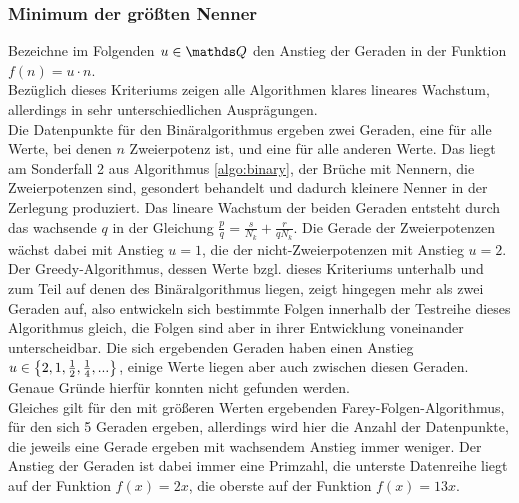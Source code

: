 \subsubsection{Minimum der größten Nenner}
Bezeichne im Folgenden $u \in \Q$ den Anstieg der Geraden in der Funktion $f(n)=u \cdot n$.\\
Bezüglich dieses Kriteriums zeigen alle Algorithmen klares lineares Wachstum, allerdings in sehr unterschiedlichen Ausprägungen.\\ 
Die Datenpunkte für den Binäralgorithmus ergeben zwei Geraden, eine für alle Werte, bei denen $n$ Zweierpotenz ist, und eine für alle anderen Werte. Das liegt am Sonderfall 2 aus Algorithmus \ref{algo:binary}, der Brüche mit Nennern, die Zweierpotenzen sind, gesondert behandelt und dadurch kleinere Nenner in der Zerlegung produziert. Das lineare Wachstum der beiden Geraden entsteht durch das wachsende $q$ in der Gleichung $\frac{p}{q} = \frac{s}{N_k} + \frac{r}{qN_k}$. Die Gerade der Zweierpotenzen wächst dabei mit Anstieg $u = 1$, die der nicht-Zweierpotenzen mit Anstieg $u=2$.\\
Der Greedy-Algorithmus, dessen Werte bzgl. dieses Kriteriums unterhalb und zum Teil auf denen des Binäralgorithmus liegen, zeigt hingegen mehr als zwei Geraden auf, also entwickeln sich bestimmte Folgen innerhalb der Testreihe dieses Algorithmus gleich, die Folgen sind aber in ihrer Entwicklung voneinander unterscheidbar. Die sich ergebenden Geraden haben einen Anstieg $u \in \left\{ 2, 1, \frac{1}{2}, \frac{1}{4}, ... \right\}$, einige Werte liegen aber auch zwischen diesen Geraden. Genaue Gründe hierfür konnten nicht gefunden werden.\\
Gleiches gilt für den mit größeren Werten ergebenden Farey-Folgen-Algorithmus, für den sich 5 Geraden ergeben, allerdings wird hier die Anzahl der Datenpunkte, die jeweils eine Gerade ergeben mit wachsendem Anstieg immer weniger. Der Anstieg der Geraden ist dabei immer eine Primzahl, die unterste Datenreihe liegt auf der Funktion $f(x)=2x$, die oberste auf der Funktion $f(x) = 13x$. 



